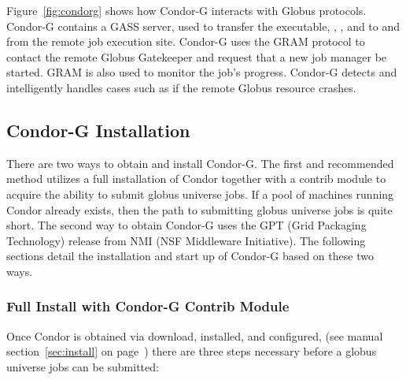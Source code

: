 Figure~\ref{fig:condorg} shows how Condor-G interacts with Globus protocols.
Condor-G contains a GASS server, used to transfer the executable,
, , and  to and from
the remote job execution site.
Condor-G uses the GRAM protocol to contact the remote Globus Gatekeeper
and request that a new job manager be started.
GRAM is also used to monitor the job's progress.
Condor-G detects and intelligently handles cases
such as if the remote Globus resource crashes.

\subsection{\label{sec:Condor-G-Install}Condor-G Installation}
There are two ways to obtain and install Condor-G.
The first and recommended method utilizes a full installation
of Condor together with a contrib module to acquire the
ability to submit globus universe jobs.
If a pool of machines running Condor \VersionNotice
already exists,
then the path to submitting globus universe jobs is quite short.
The second way to obtain Condor-G uses the GPT (Grid Packaging
Technology) release from NMI (NSF Middleware Initiative).
The following sections detail the installation and start up
of Condor-G based on these two ways.

\subsubsection{\label{sec:Condor-G-FullInstall}Full Install with Condor-G Contrib Module}
Once Condor is obtained via download, installed, and configured,
(see manual
section~\ref{sec:install} on page~\pageref{sec:install})
there are three steps necessary before a globus universe jobs
can be submitted:

